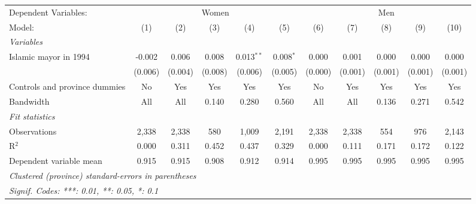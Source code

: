 
\begingroup
\centering
\begin{adjustbox}{max width=\textwidth}
   \begin{tabular}{lcccccccccc}
      \tabularnewline \midrule \midrule
      Dependent Variables: & \multicolumn{5}{c}{Women} & \multicolumn{5}{c}{Men}\\
      Model:                        & (1)     & (2)     & (3)     & (4)          & (5)         & (6)     & (7)     & (8)     & (9)     & (10)\\  
      \midrule
      \emph{Variables}\\
      Islamic mayor in 1994         & -0.002  & 0.006   & 0.008   & 0.013$^{**}$ & 0.008$^{*}$ & 0.000   & 0.001   & 0.000   & 0.000   & 0.000\\   
                                    & (0.006) & (0.004) & (0.008) & (0.006)      & (0.005)     & (0.000) & (0.001) & (0.001) & (0.001) & (0.001)\\   
      Controls and province dummies & No      & Yes     & Yes     & Yes          & Yes         & No      & Yes     & Yes     & Yes     & Yes\\  
      Bandwidth                     & All     & All     & 0.140   & 0.280        & 0.560       & All     & All     & 0.136   & 0.271   & 0.542\\  
      \midrule
      \emph{Fit statistics}\\
      Observations                  & 2,338   & 2,338   & 580     & 1,009        & 2,191       & 2,338   & 2,338   & 554     & 976     & 2,143\\  
      R$^2$                         & 0.000   & 0.311   & 0.452   & 0.437        & 0.329       & 0.000   & 0.111   & 0.171   & 0.172   & 0.122\\  
      Dependent variable mean       & 0.915   & 0.915   & 0.908   & 0.912        & 0.914       & 0.995   & 0.995   & 0.995   & 0.995   & 0.995\\  
      \midrule \midrule
      \multicolumn{11}{l}{\emph{Clustered (province) standard-errors in parentheses}}\\
      \multicolumn{11}{l}{\emph{Signif. Codes: ***: 0.01, **: 0.05, *: 0.1}}\\
   \end{tabular}
\end{adjustbox}
\par\endgroup


